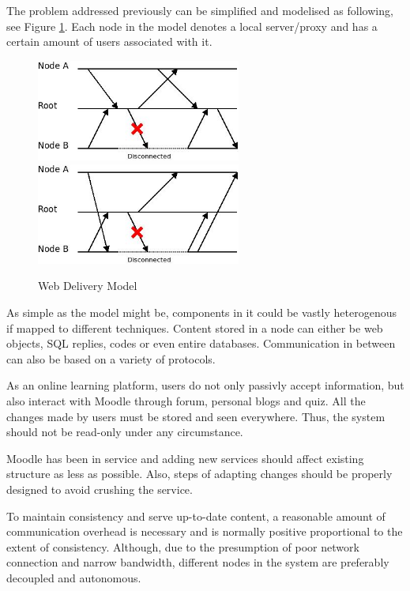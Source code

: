 The problem addressed previously can be simplified and modelised as following,
see Figure \ref{problem_model}. Each node in the model denotes a local
server/proxy and has a certain amount of users associated with it.

\begin{figure}[htbp]
\centering
\includegraphics[width=0.6\textwidth]{../images/model_centralized.jpeg}
\includegraphics[width=0.6\textwidth]{../images/model_distributed.jpeg}
\caption{Web Delivery Model}
\label{problem_model}
\end{figure}

As simple as the model might be, components in it could be vastly heterogenous if mapped to different techniques. Content stored in a node can either be web objects, SQL replies, codes or even entire databases. Communication in between can also be based on a variety of protocols.

As an online learning platform, users do not only passivly accept information, but also interact with Moodle through forum, personal blogs and quiz. All the changes made by users must be stored and seen everywhere. Thus, the system should not be read-only under any circumstance.



Moodle has been in service and adding new services should affect existing structure as less as possible. Also, steps of adapting changes should be properly designed to avoid crushing the service.

To maintain consistency and serve up-to-date content, a reasonable amount of
communication overhead is necessary and is normally positive proportional to the
extent of consistency. Although, due to the presumption of poor network
connection and narrow bandwidth, different nodes in the system are preferably
decoupled and autonomous.

